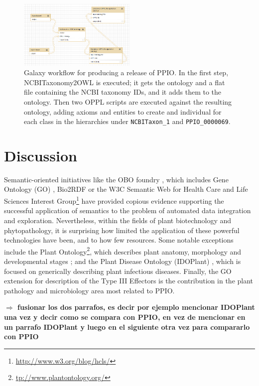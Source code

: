 \documentclass[sw]{iosart2c}
\newcommand{\myurl}[1]{\footnote{\url{#1}}}
\newcommand{\todo}[1]{\textbf{{\color{blue}$\Longrightarrow$ #1}}}
\newcommand{\con}[1]{\texttt{#1}\xspace}
\begin{document}
\begin{figure}
\includegraphics[width=0.5\textwidth]{galaxy-workflow.png}
\caption{Galaxy workflow for producing a release of PPIO. In the first step, NCBITaxonomy2OWL is executed; it gets the ontology and a flat file containing the NCBI taxonomy IDs, and it adds them to the ontology. Then two OPPL scripts are executed against the resulting ontology, adding axioms and entities to create and individual for each class in the hierarchies under \con{NCBITaxon\_1} and \con{PPIO\_0000069}.}\label{fig:galaxy-workflow}
\end{figure}


\section{Discussion}\label{sec:discussion}

Semantic-oriented initiatives like the OBO foundry \cite{Smith}, which includes Gene Ontology (GO) \cite{Gene}, Bio2RDF \cite{RDF} or the W3C Semantic Web for Health Care and Life Sciences Interest Group\myurl{http://www.w3.org/blog/hcls/} have provided copious evidence supporting the successful application of semantics to the problem of automated data integration and exploration. Nevertheless, within the fields of plant biotechnology and phytopathology, it is surprising how limited the application of these powerful technologies have been, and to how few resources. Some notable exceptions include the Plant Ontology\myurl{tp://www.plantontology.org/}, which describes plant anatomy, morphology and developmental stages \cite{PO}; and the Plant Disease Ontology (IDOPlant) \cite{Walls} \cite{IDO}, which is focused on generically describing plant infectious diseases. Finally, the GO extension for description of the Type III Effectors \cite{Lindeberg} is the contribution in the plant pathology and microbiology area most related to PPIO.

\todo{fusionar los dos parrafos, es decir por ejemplo mencionar IDOPlant una vez y decir como se compara con PPIO, en vez de mencionar en un parrafo IDOPlant y luego en el siguiente otra vez para compararlo con PPIO}
\end{document}
